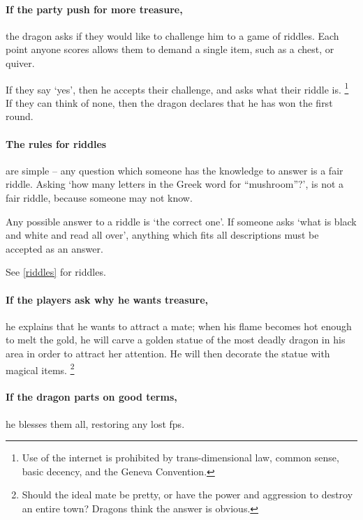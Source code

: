 \paragraph{If the party push for more treasure,}
the dragon asks if they would like to challenge him to a game of riddles.
Each point anyone scores allows them to demand a single item, such as a chest, or quiver.

If they say `yes', then he accepts their challenge, and asks what their riddle is.%
\footnote{Use of the internet is prohibited by trans-dimensional law, common sense, basic decency, and the Geneva Convention.}
If they can think of none,
then the dragon declares that he has won the first round.

\paragraph{The rules for riddles}
are simple -- any question which someone has the knowledge to answer is a fair riddle.
Asking `how many letters in the Greek word for ``mushroom''?', is not a fair riddle, because someone may not know.

Any possible answer to a riddle is `the correct one'.
If someone asks `what is black and white and read all over', anything which fits all descriptions must be accepted as an answer.

See \autoref{riddles} for riddles.

\warrenDragon

\showStdSpells[
  \setcounter{diceNo}{1}
  
]

\paragraph{If the players ask why he wants treasure,}
he explains that he wants to attract a mate; when his flame becomes hot enough to melt the gold, he will carve a golden statue of the most deadly dragon in his area in order to attract her attention.
He will then decorate the statue with magical items.%
\footnote{Should the ideal mate be pretty, or have the power and aggression to destroy an entire town?
Dragons think the answer is obvious.}

\paragraph{If the dragon parts on good terms,}
he blesses them all, restoring any lost \glspl{fp}.

